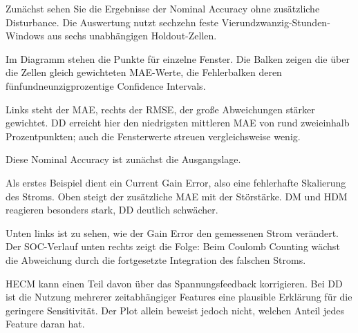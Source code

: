 
\begin{sprechtext}

Zunächst sehen Sie die Ergebnisse der Nominal Accuracy ohne zusätzliche Disturbance. Die Auswertung nutzt sechzehn feste Vierundzwanzig-Stunden-Windows aus sechs unabhängigen Holdout-Zellen.

Im Diagramm stehen die Punkte für einzelne Fenster. Die Balken zeigen die über die Zellen gleich gewichteten MAE-Werte, die Fehlerbalken deren fünfundneunzigprozentige Confidence Intervals.

Links steht der MAE, rechts der RMSE, der große Abweichungen stärker gewichtet. DD erreicht hier den niedrigsten mittleren MAE von rund zweieinhalb Prozentpunkten; auch die Fensterwerte streuen vergleichsweise wenig.

Diese Nominal Accuracy ist zunächst die Ausgangslage.

\end{sprechtext}


\begin{sprechtext}

Als erstes Beispiel dient ein Current Gain Error, also eine fehlerhafte Skalierung des Stroms. Oben steigt der zusätzliche MAE mit der Störstärke. DM und HDM reagieren besonders stark, DD deutlich schwächer.

Unten links ist zu sehen, wie der Gain Error den gemessenen Strom verändert. Der SOC-Verlauf unten rechts zeigt die Folge: Beim Coulomb Counting wächst die Abweichung durch die fortgesetzte Integration des falschen Stroms.

HECM kann einen Teil davon über das Spannungsfeedback korrigieren. Bei DD ist die Nutzung mehrerer zeitabhängiger Features eine plausible Erklärung für die geringere Sensitivität. Der Plot allein beweist jedoch nicht, welchen Anteil jedes Feature daran hat.

\end{sprechtext}


